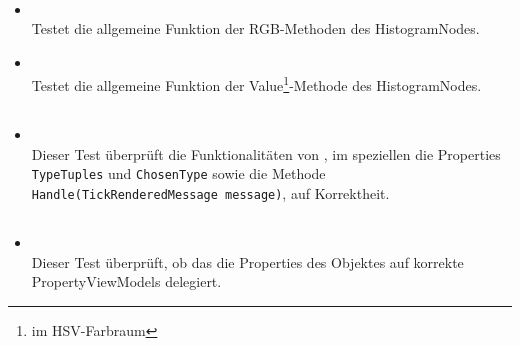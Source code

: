 \paragraph{}
\begin{itemize}
	\item{} \\
		Testet die allgemeine Funktion der RGB-Methoden des HistogramNodes.
	
	\item{} \\
		Testet die allgemeine Funktion der Value\footnote{im HSV-Farbraum}-Methode des HistogramNodes.
\end{itemize}



\subsection{}

\paragraph{}

\begin{itemize}

\item{}~\\
Dieser Test überprüft die Funktionalitäten von , im speziellen die Properties \verb#TypeTuples# und \verb#ChosenType# sowie die Methode \verb#Handle(TickRenderedMessage message)#, auf Korrektheit.

\end{itemize}

\subsection{}

\paragraph{}

\begin{itemize}

\item{}~\\
Dieser Test überprüft, ob das  die Properties des Objektes auf korrekte PropertyViewModels delegiert.

\end{itemize}

